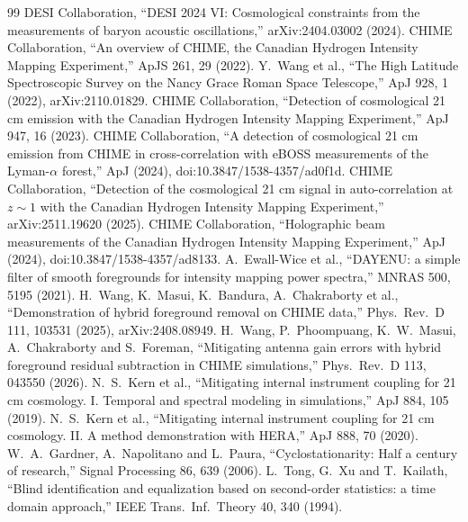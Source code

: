 \documentclass[12pt]{article}
\begin{document}
\begin{thebibliography}{99}\small
{} DESI Collaboration, ``DESI 2024 VI: Cosmological constraints from the measurements of baryon acoustic oscillations,'' arXiv:2404.03002 (2024).
 CHIME Collaboration, ``An overview of CHIME, the Canadian Hydrogen Intensity Mapping Experiment,'' ApJS 261, 29 (2022).
 Y.~Wang et al., ``The High Latitude Spectroscopic Survey on the Nancy Grace Roman Space Telescope,'' ApJ 928, 1 (2022), arXiv:2110.01829.
 CHIME Collaboration, ``Detection of cosmological 21 cm emission with the Canadian Hydrogen Intensity Mapping Experiment,'' ApJ 947, 16 (2023).
 CHIME Collaboration, ``A detection of cosmological 21 cm emission from CHIME in cross-correlation with eBOSS measurements of the Lyman-$\alpha$ forest,'' ApJ (2024), doi:10.3847/1538-4357/ad0f1d.
 CHIME Collaboration, ``Detection of the cosmological 21 cm signal in auto-correlation at $z\sim1$ with the Canadian Hydrogen Intensity Mapping Experiment,'' arXiv:2511.19620 (2025).
 CHIME Collaboration, ``Holographic beam measurements of the Canadian Hydrogen Intensity Mapping Experiment,'' ApJ (2024), doi:10.3847/1538-4357/ad8133.
 A.~Ewall-Wice et al., ``DAYENU: a simple filter of smooth foregrounds for intensity mapping power spectra,'' MNRAS 500, 5195 (2021).
 H.~Wang, K.~Masui, K.~Bandura, A.~Chakraborty et al., ``Demonstration of hybrid foreground removal on CHIME data,'' Phys.\ Rev.\ D 111, 103531 (2025), arXiv:2408.08949.
 H.~Wang, P.~Phoompuang, K.~W.~Masui, A.~Chakraborty and S.~Foreman, ``Mitigating antenna gain errors with hybrid foreground residual subtraction in CHIME simulations,'' Phys.\ Rev.\ D 113, 043550 (2026).
 N.~S.~Kern et al., ``Mitigating internal instrument coupling for 21 cm cosmology. I. Temporal and spectral modeling in simulations,'' ApJ 884, 105 (2019).
 N.~S.~Kern et al., ``Mitigating internal instrument coupling for 21 cm cosmology. II. A method demonstration with HERA,'' ApJ 888, 70 (2020).
 W.~A.~Gardner, A.~Napolitano and L.~Paura, ``Cyclostationarity: Half a century of research,'' Signal Processing 86, 639 (2006).
 L.~Tong, G.~Xu and T.~Kailath, ``Blind identification and equalization based on second-order statistics: a time domain approach,'' IEEE Trans.\ Inf.\ Theory 40, 340 (1994).

\end{thebibliography}
\end{document}
